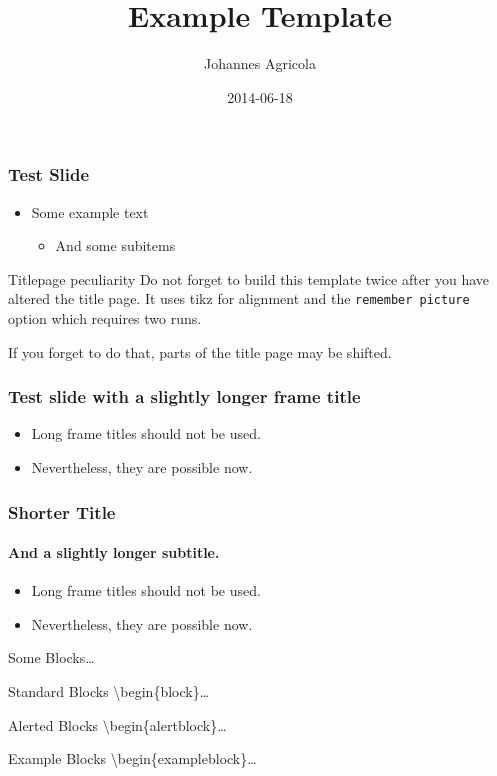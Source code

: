 \documentclass[10pt]{beamer}
\title{Example Template}
\date{2014-06-18}
\author[Johannes Agricola]{Johannes Agricola}
\institute[2. Physik]{II. Physikalisches Institut}
\begin{document}
\begin{frame}
  \titlepage
\end{frame}

\begin{frame}
  \frametitle{Test Slide}

  \begin{itemize}
    \item 
      Some example text
      \begin{itemize}
        \item 
          And some subitems
      \end{itemize}
  \end{itemize}

  \begin{alertblock}{Titlepage peculiarity}
    Do not forget to build this template twice after you have altered
    the title page. It uses tikz for alignment and the 
    \texttt{remember picture} option which requires two runs.

    If you forget to do that, parts of the title page may be shifted.
  \end{alertblock}
\end{frame}

\begin{frame}
  \frametitle{Test slide with a slightly longer frame title}

  \begin{itemize}
    \item 
      Long frame titles should not be used. 
    \item
      Nevertheless, they are possible now.
  \end{itemize}
\end{frame}
\begin{frame}
  \frametitle{Shorter Title}
  \framesubtitle{And a slightly longer subtitle.}

  \begin{itemize}
    \item 
      Long frame titles should not be used. 
    \item
      Nevertheless, they are possible now.
  \end{itemize}
\end{frame}

\begin{frame}{Some Blocks\ldots}
  \begin{block}{Standard Blocks}
    \textbackslash{}begin\{block\}\ldots
  \end{block}
  \begin{alertblock}{Alerted Blocks}
    \textbackslash{}begin\{alertblock\}\ldots
  \end{alertblock}
  \begin{exampleblock}{Example Blocks}
    \textbackslash{}begin\{exampleblock\}\ldots
  \end{exampleblock}
\end{frame}
\end{document}
